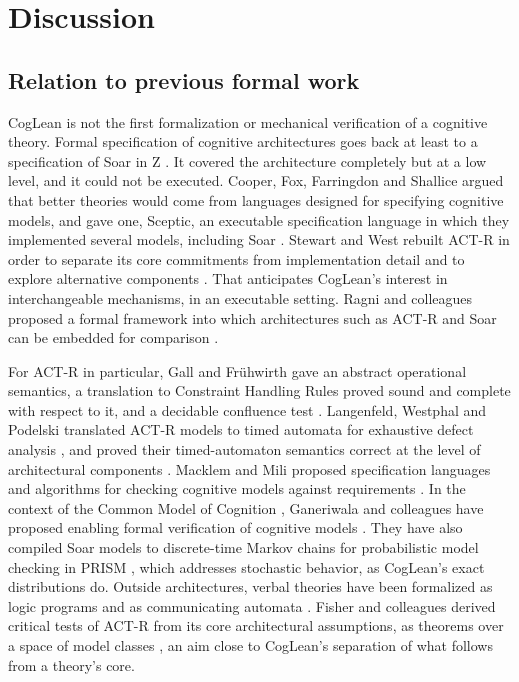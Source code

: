 \documentclass[11pt]{article}
\begin{document}
\section{Discussion}
\label{sec:discussion}

\subsection{Relation to previous formal work}

CogLean is not the first formalization or mechanical verification of a cognitive theory. Formal specification of cognitive architectures goes back at least to a specification of Soar in Z \citep{milnes1992}. It covered the architecture completely but at a low level, and it could not be executed. Cooper, Fox, Farringdon and Shallice argued that better theories would come from languages designed for specifying cognitive models, and gave one, Sceptic, an executable specification language in which they implemented several models, including Soar \citep{cooper1996}. Stewart and West rebuilt ACT-R in order to separate its core commitments from implementation detail and to explore alternative components \citep{stewart2007}. That anticipates CogLean's interest in interchangeable mechanisms, in an executable setting. Ragni and colleagues proposed a formal framework into which architectures such as ACT-R and Soar can be embedded for comparison \citep{ragni2018}.

For ACT-R in particular, Gall and Frühwirth gave an abstract operational semantics, a translation to Constraint Handling Rules proved sound and complete with respect to it, and a decidable confluence test \citep{gall2018,gall2017confluence}. Langenfeld, Westphal and Podelski translated ACT-R models to timed automata for exhaustive defect analysis \citep{langenfeld2019}, and proved their timed-automaton semantics correct at the level of architectural components \citep{langenfeld2021}. Macklem and Mili proposed specification languages and algorithms for checking cognitive models against requirements \citep{macklem2006}. In the context of the Common Model of Cognition \citep{laird2017}, Ganeriwala and colleagues have proposed enabling formal verification of cognitive models \citep{ganeriwala2025}. They have also compiled Soar models to discrete-time Markov chains for probabilistic model checking in PRISM \citep{ganeriwala2026,kwiatkowska2011}, which addresses stochastic behavior, as CogLean's exact distributions do. Outside architectures, verbal theories have been formalized as logic programs \citep{rohner2021} and as communicating automata \citep{finkel2025}. Fisher and colleagues derived critical tests of ACT-R from its core architectural assumptions, as theorems over a space of model classes \citep{fisher2025}, an aim close to CogLean's separation of what follows from a theory's core.
\end{document}
